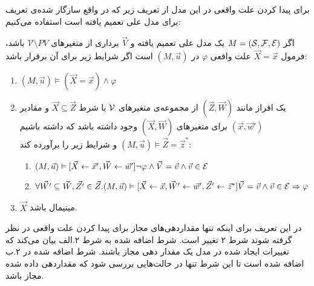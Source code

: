 برای پیدا کردن علت واقعی در این مدل از تعریف زیر که در واقع سازگار شده‌ی تعریف
برای مدل‌ علی تعمیم یافته است استفاده می‌کنیم:

\begin{definition}
    \label{def:extended}
    اگر
    $M = (\mathcal{S},\mathcal{F},\mathcal{E})$
    یک مدل علی تعمیم یافته و
    $\vec V$
    برداری از متغیر‌های
    $\mathcal{V} \setminus PV$
    باشد،
    فرمول
    $\vec X = \vec x$
    علت واقعی
    $\varphi$
    در
    $(M,\vec{u})$
    است
    اگر شرایط زیر برای آن برقرار باشد:
    \begin{enumerate}
        \item $(M,\vec{u}) \vDash (\vec{X} = \vec{x}) \wedge \varphi$
        \item یک افراز مانند
              $(\vec{Z},\vec{W})$
              از مجموعه‌ی متغیر‌های
              $\mathcal{V}$
              با شرط
              $\vec{X} \subseteq \vec{Z}$
              و مقادیر
              $(\vec{x},\vec{w}')$
              برای متغیر‌های
              $(\vec{X},\vec{W})$
              وجود داشته باشد که داشته باشیم
              $(M,\vec{u})\vDash \vec{Z} = \vec{z}^*$
              و شرایط زیر را برآورده کند:
              \begin{enumerate}
                  \item $(M,\vec u)\vDash
                  [\vec{X}\leftarrow\vec{x}',\vec{W}\leftarrow\vec{w}'] 
                  \neg \varphi \wedge \vec V = \vec v 
                  \wedge \vec v \in \mathcal{E}$
                  \item $\forall \vec{W'} \subseteq \vec{W},\vec{Z'}\in \vec{Z}.
                            (M,\vec{u})\vDash [\vec X\leftarrow\vec x,\vec{W}'\leftarrow \vec{w}',\vec{Z}'\leftarrow \vec{z}^*]
                            \vec V = \vec v \wedge \vec v \in \mathcal{E}
                            \Rightarrow \varphi$
              \end{enumerate}
        \item $\vec X$
              مینیمال باشد.
    \end{enumerate}
\end{definition}
در این تعریف برای اینکه تنها مقداردهی‌های مجاز برای پیدا کردن علت واقعی در نظر گرفته شوند شرط ۲ تغییر است.
شرط اضافه شده به شرط ۲.الف بیان می‌کند که تغییرات ایجاد شده در مدل یک مقدار دهی مجاز باشند.
شرط اضافه شده در ۲.ب اضافه شده است تا این شرط تنها در حالت‌هایی بررسی شود که مقداردهی داده شده مجاز باشد.



